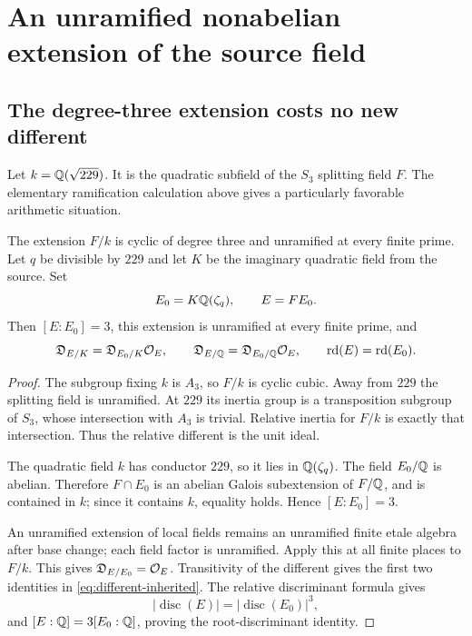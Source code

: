 \section{An unramified nonabelian extension of the source field}
\label{sec:unramified}

\subsection{The degree-three extension costs no new different}

Let $k=\mathbb Q(\sqrt{229})$. It is the quadratic subfield of the $S_3$ splitting field $F$. The elementary ramification calculation above gives a particularly favorable arithmetic situation.

\begin{theorem}\label{thm:unramified}
The extension $F/k$ is cyclic of degree three and unramified at every finite prime. Let $q$ be divisible by $229$ and let $K$ be the imaginary quadratic field from the source. Set
\[
 E_0=K\mathbb Q(\zeta_q),\qquad E=F E_0.
\]
Then $[E:E_0]=3$, this extension is unramified at every finite prime, and
\begin{equation}\label{eq:different-inherited}
 \mathfrak D_{E/K}=\mathfrak D_{E_0/K}\mathcal O_E,\qquad
 \mathfrak D_{E/\mathbb Q}=\mathfrak D_{E_0/\mathbb Q}\mathcal O_E,\qquad
 \operatorname{rd}(E)=\operatorname{rd}(E_0).
\end{equation}
\end{theorem}

\begin{proof}
The subgroup fixing $k$ is $A_3$, so $F/k$ is cyclic cubic. Away from $229$ the splitting field is unramified. At $229$ its inertia group is a transposition subgroup of $S_3$, whose intersection with $A_3$ is trivial. Relative inertia for $F/k$ is exactly that intersection. Thus the relative different is the unit ideal.

The quadratic field $k$ has conductor $229$, so it lies in $\mathbb Q(\zeta_q)$. The field $E_0/\mathbb Q$ is abelian. Therefore $F\cap E_0$ is an abelian Galois subextension of $F/\mathbb Q$, and is contained in $k$; since it contains $k$, equality holds. Hence $[E:E_0]=3$.

An unramified extension of local fields remains an unramified finite etale algebra after base change; each field factor is unramified. Apply this at all finite places to $F/k$. This gives $\mathfrak D_{E/E_0}=\mathcal O_E$. Transitivity of the different gives the first two identities in \eqref{eq:different-inherited}. The relative discriminant formula gives
\[
 |\operatorname{disc}(E)|=|\operatorname{disc}(E_0)|^3,
\]
and $[E:\mathbb Q]=3[E_0:\mathbb Q]$, proving the root-discriminant identity.
\end{proof}

